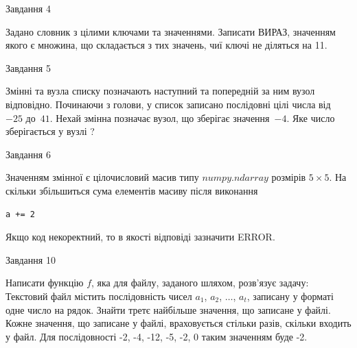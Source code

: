 \documentclass[12pt, ukrainian]{article}
\begin{document}
{\begin{minipage}[t]{8.0cm}
\end{minipage}


               
{\begin{center}Завдання {4}\end{center}}
\vspace{-4mm}
Задано словник  з цілими ключами та значеннями. Записати ВИРАЗ, значенням якого є множина, що складається  з тих значень, чиї ключі не діляться на 11.\par

\vspace{10mm}
               
{\begin{center}Завдання {5}\end{center}}
\vspace{-4mm}
Змінні  та  вузла списку позначають наступний та попередній за ним вузол відповідно. Починаючи з голови, у список записано послідовні цілі числа від~$-25$ до~$41$. Нехай змінна  позначає вузол, що зберігає значення~$-4$.
Яке число зберігається у вузлі  ?\par

               
{\begin{center}Завдання {6}\end{center}}
\vspace{-4mm}
Значенням змінної  є цілочисловий масив типу $numpy.ndarray$ розмірів $5{\times}5$. На скільки збільшиться сума елементів масиву  після виконання
\begin{verbatim}
a += 2
\end{verbatim}


Якщо код некоректний, то в якості відповіді зазначити ERROR.\par

               
{\begin{center}Завдання {10}\end{center}}
\vspace{-4mm}

Написати функцію $f$, яка для файлу, заданого шляхом, розв’язує задачу:\\ Текстовий файл містить послідовність чисел $a_1$, $a_2$, $\ldots$, $a_t$, записану у форматі одне число на рядок. Знайти третє найбільше значення, що записане у файлі. Кожне значення, що записане у файлі, враховується стільки разів, скільки входить у файл. Для послідовності -2, -4, -12, -5, -2, 0 таким значенням буде -2.

}
\end{document}
